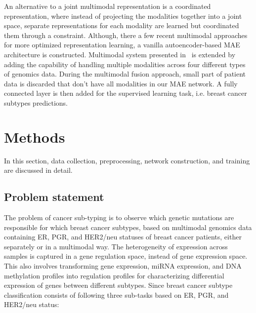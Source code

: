 \hspace*{3.5mm} An alternative to a joint multimodal representation is a coordinated representation, where instead of projecting the modalities together into a joint space, separate representations for each modality are learned but coordinated them through a constraint. Although, there a few recent multimodal approaches for more optimized representation learning, a vanilla autoencoder-based MAE architecture is constructed. Multimodal system presented in~\cite{wang2018associativemulti} is extended by adding the capability of handling multiple modalities across four different types of genomics data. During the multimodal fusion approach, small part of patient data is discarded that don't have all modalities in our MAE network. A fully connected layer is then added for the supervised learning task, i.e. breast cancer subtypes predictions. 


\section{Methods}\label{chapter_4:mm}
In this section, data collection, preprocessing, network construction, and training are discussed in detail. 

\subsection{Problem statement}
The problem of cancer sub-typing is to observe which genetic mutations are responsible for which breast cancer subtypes, based on multimodal genomics data containing ER, PGR, and HER2/neu statuses of breast cancer patients, either separately or in a multimodal way. 
The heterogeneity of expression across samples is captured in a gene regulation space, instead of gene expression space. This also involves transforming gene expression, miRNA expression, and DNA methylation profiles into regulation profiles for characterizing differential expression of genes between different subtypes. Since breast cancer subtype classification consists of following three sub-tasks based on ER, PGR, and HER2/neu status: %

